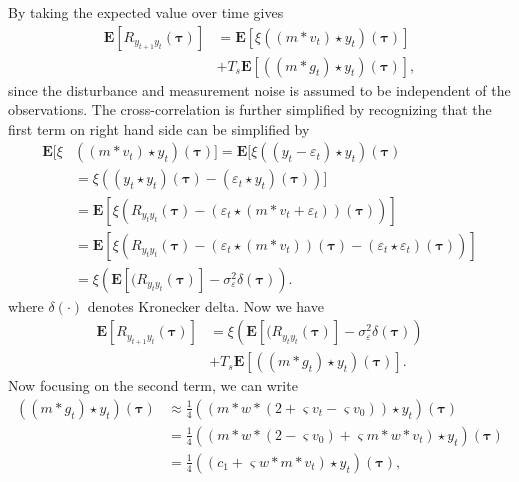 \documentclass[conference,onecolumn]{IEEEtran}
\begin{document}
By taking the expected value over time gives
\begin{align}
	\mathbf{E}[R_{y_{t+1}y_t}(\boldsymbol{\tau})] &= \mathbf{E}[\xi\left(\left(m \ast v_t\right) \star y_t \right)(\boldsymbol{\tau})] \nonumber \\
	 &+ T_s \mathbf{E}[\left(\left(m\ast g_t\right)\star y_t \right)(\boldsymbol{\tau})],
\end{align}
since the disturbance and measurement noise is assumed to be independent of the observations. 
The cross-correlation is further simplified by recognizing that the first term on right hand side can be simplified by
\begin{align}
	\mathbf{E}[\xi&\left(\left(m \ast v_t \right) \star y_t \right)(\boldsymbol{\tau})] = \mathbf{E}[\xi\left(\left(y_t-\varepsilon_t\right) \star y_t \right)(\boldsymbol{\tau}) \\
	&= \xi ((y_t \star y_t)(\boldsymbol{\tau}) - \left(\varepsilon_t\star y_t \right)(\boldsymbol{\tau}))] \\
	&= \mathbf{E}[\xi (R_{y_ty_t}(\boldsymbol{\tau})  - \left(\varepsilon_t \star (m\ast v_t + \varepsilon_t)\right) (\boldsymbol{\tau}))] \\
	&=\mathbf{E}[\xi (R_{y_ty_t}(\boldsymbol{\tau})  -\left(\varepsilon_t\star (m\ast v_t)\right)(\boldsymbol{\tau}) - (\varepsilon_t\star\varepsilon_t)(\boldsymbol{\tau}))] \\
	&= \xi\left(\mathbf{E}[ (R_{y_ty_t}(\boldsymbol{\tau})] - \sigma_{\varepsilon}^2 \delta(\boldsymbol{\tau})\right).
\end{align}
where $\delta\left(\cdot\right)$ denotes Kronecker delta. Now we have
\begin{align}
	\mathbf{E}[R_{y_{t+1}y_t}(\boldsymbol{\tau})] &= \xi\left(\mathbf{E}[ (R_{y_ty_t}(\boldsymbol{\tau})] - \sigma_{\varepsilon}^2 \delta(\boldsymbol{\tau})\right) \nonumber \\
	&+ T_s\mathbf{E}[ \left(\left(m\ast g_t\right)\star y_t \right)(\boldsymbol{\tau})].
\end{align}
Now focusing on the second term, we can write
\begin{align}
	((m \ast g_t) \star y_t)(\boldsymbol\tau) &\approx \frac{1}{4}((m \ast w \ast (2 + \varsigma v_t - \varsigma v_0))\star y_t)(\boldsymbol\tau) \\
	&= \frac{1}{4}((m\ast w \ast (2 -\varsigma v_0) + \varsigma m\ast w\ast v_t) \star y_t)(\boldsymbol\tau) \\
&= \frac{1}{4}((c_1 + \varsigma w \ast m\ast v_t) \star y_t)(\boldsymbol\tau),
\end{align}
\end{document}

